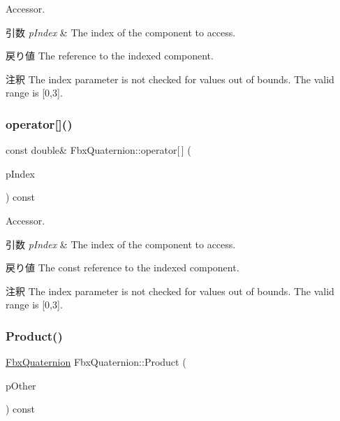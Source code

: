 Accessor. 
\begin{DoxyParams}{引数}
{\em p\+Index} & The index of the component to access. \\
\hline
\end{DoxyParams}
\begin{DoxyReturn}{戻り値}
The reference to the indexed component. 
\end{DoxyReturn}
\begin{DoxyRemark}{注釈}
The index parameter is not checked for values out of bounds. The valid range is \mbox{[}0,3\mbox{]}. 
\end{DoxyRemark}
\mbox{\label{class_fbx_quaternion_a5d485a6d21257f1a92eca379e3d2e69f}} 
\subsubsection{\texorpdfstring{operator[]()}{operator[]()}\hspace{0.1cm}{\footnotesize\ttfamily [2/2]}}
{\footnotesize\ttfamily const double\& Fbx\+Quaternion\+::operator\mbox{[}$\,$\mbox{]} (\begin{DoxyParamCaption}\item[{int}]{p\+Index }\end{DoxyParamCaption}) const}

Accessor. 
\begin{DoxyParams}{引数}
{\em p\+Index} & The index of the component to access. \\
\hline
\end{DoxyParams}
\begin{DoxyReturn}{戻り値}
The const reference to the indexed component. 
\end{DoxyReturn}
\begin{DoxyRemark}{注釈}
The index parameter is not checked for values out of bounds. The valid range is \mbox{[}0,3\mbox{]}. 
\end{DoxyRemark}
\mbox{\label{class_fbx_quaternion_a4b915abc82fa0199c15f07fa3814a3ec}} 
\subsubsection{\texorpdfstring{Product()}{Product()}}
{\footnotesize\ttfamily \hyperlink{class_fbx_quaternion}{Fbx\+Quaternion} Fbx\+Quaternion\+::\+Product (\begin{DoxyParamCaption}\item[{const \hyperlink{class_fbx_quaternion}{Fbx\+Quaternion} \&}]{p\+Other }\end{DoxyParamCaption}) const}

